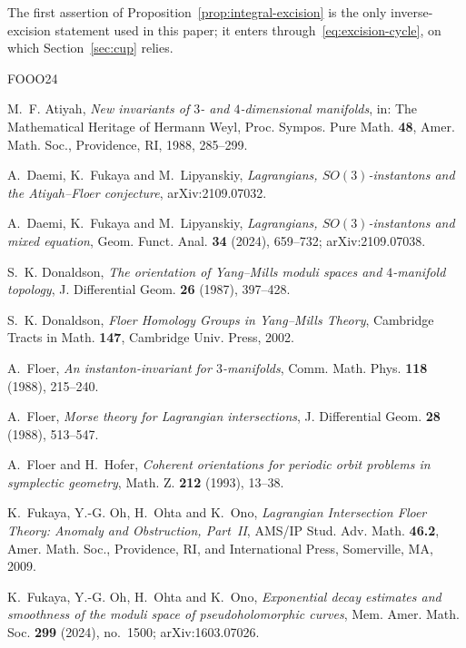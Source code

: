 \documentclass[11pt]{amsart}
\theoremstyle{definition}
\theoremstyle{remark}
\theoremstyle{plain}
\numberwithin{equation}{section}
\begin{document}
The first assertion of Proposition~\ref{prop:integral-excision} is the only inverse-excision statement used in this paper; it enters through~\eqref{eq:excision-cycle}, on which Section~\ref{sec:cup} relies.

\begin{thebibliography}{FOOO24}

M.~F. Atiyah, \emph{New invariants of $3$- and $4$-dimensional manifolds}, in:
The Mathematical Heritage of Hermann Weyl, Proc. Sympos. Pure Math.
\textbf{48}, Amer. Math. Soc., Providence, RI, 1988, 285--299.

A.~Daemi, K.~Fukaya and M.~Lipyanskiy,
\emph{Lagrangians, $SO(3)$-instantons and the Atiyah--Floer conjecture},
arXiv:2109.07032.

A.~Daemi, K.~Fukaya and M.~Lipyanskiy,
\emph{Lagrangians, $SO(3)$-instantons and mixed equation},
Geom. Funct. Anal. \textbf{34} (2024), 659--732;
arXiv:2109.07038.

S.~K. Donaldson, \emph{The orientation of Yang--Mills moduli spaces
and $4$-manifold topology}, J. Differential Geom. \textbf{26}
(1987), 397--428.

S.~K. Donaldson, \emph{Floer Homology Groups in Yang--Mills Theory},
Cambridge Tracts in Math. \textbf{147}, Cambridge Univ. Press, 2002.

A.~Floer, \emph{An instanton-invariant for $3$-manifolds}, Comm. Math. Phys.
\textbf{118} (1988), 215--240.

A.~Floer, \emph{Morse theory for Lagrangian intersections}, J. Differential Geom.
\textbf{28} (1988), 513--547.

A.~Floer and H.~Hofer, \emph{Coherent orientations for periodic
orbit problems in symplectic geometry}, Math. Z. \textbf{212}
(1993), 13--38.

K.~Fukaya, Y.-G. Oh, H.~Ohta and K.~Ono, \emph{Lagrangian Intersection Floer Theory:
Anomaly and Obstruction, Part~II}, AMS/IP Stud. Adv. Math. \textbf{46.2}, Amer. Math. Soc.,
Providence, RI, and International Press, Somerville, MA, 2009.

K.~Fukaya, Y.-G. Oh, H.~Ohta and K.~Ono, \emph{Exponential decay
estimates and smoothness of the moduli space of pseudoholomorphic
curves}, Mem. Amer. Math. Soc. \textbf{299} (2024), no.~1500; arXiv:1603.07026.


\end{thebibliography}
\end{document}
